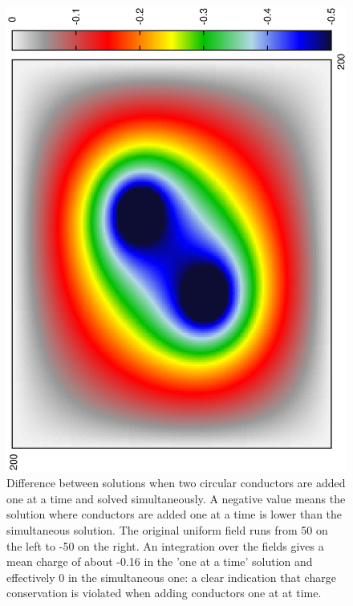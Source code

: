 \documentclass[aps,twocolumn,pre,nofootinbib,10pt]{revtex4-1}
\begin{document}
\begin{figure}
\includegraphics*[height=\breite \columnwidth,angle=270]{difference.ps} 
\caption{Difference between solutions when two circular conductors are added one at a time and solved simultaneously. A negative value means the solution where conductors are added one at a time is lower than the simultaneous solution. The original uniform field runs from 50 on the left to -50 on the right. An integration over the fields gives a mean charge of about -0.16 in the 'one at a time' solution and effectively 0 in the simultaneous one: a clear indication that charge conservation is violated when adding conductors one at at time.}
\label{fig:difference}
\end{figure}
 


\end{document}

